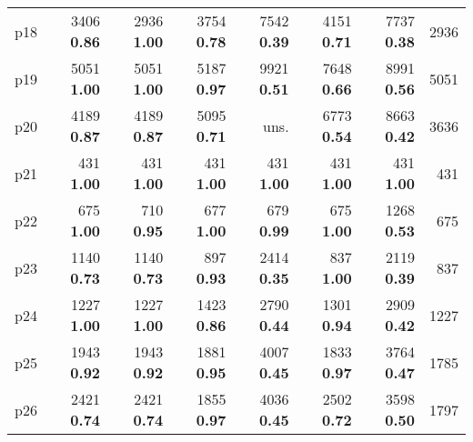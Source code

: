 \begin{tabular}{lrrrrrrr}
\multicolumn{1}{l|}{p18} & {\footnotesize 3406} \textbf{0.86} & {\footnotesize 2936} \textbf{1.00} & {\footnotesize 3754} \textbf{0.78} & {\footnotesize 7542} \textbf{0.39} & {\footnotesize 4151} \textbf{0.71} & {\footnotesize 7737} \textbf{0.38} & \multicolumn{1}{|r}{2936}\\
\multicolumn{1}{l|}{p19} & {\footnotesize 5051} \textbf{1.00} & {\footnotesize 5051} \textbf{1.00} & {\footnotesize 5187} \textbf{0.97} & {\footnotesize 9921} \textbf{0.51} & {\footnotesize 7648} \textbf{0.66} & {\footnotesize 8991} \textbf{0.56} & \multicolumn{1}{|r}{5051}\\
\multicolumn{1}{l|}{p20} & {\footnotesize 4189} \textbf{0.87} & {\footnotesize 4189} \textbf{0.87} & {\footnotesize 5095} \textbf{0.71} & uns. & {\footnotesize 6773} \textbf{0.54} & {\footnotesize 8663} \textbf{0.42} & \multicolumn{1}{|r}{3636}\\
\multicolumn{1}{l|}{p21} & {\footnotesize 431} \textbf{1.00} & {\footnotesize 431} \textbf{1.00} & {\footnotesize 431} \textbf{1.00} & {\footnotesize 431} \textbf{1.00} & {\footnotesize 431} \textbf{1.00} & {\footnotesize 431} \textbf{1.00} & \multicolumn{1}{|r}{431}\\
\multicolumn{1}{l|}{p22} & {\footnotesize 675} \textbf{1.00} & {\footnotesize 710} \textbf{0.95} & {\footnotesize 677} \textbf{1.00} & {\footnotesize 679} \textbf{0.99} & {\footnotesize 675} \textbf{1.00} & {\footnotesize 1268} \textbf{0.53} & \multicolumn{1}{|r}{675}\\
\multicolumn{1}{l|}{p23} & {\footnotesize 1140} \textbf{0.73} & {\footnotesize 1140} \textbf{0.73} & {\footnotesize 897} \textbf{0.93} & {\footnotesize 2414} \textbf{0.35} & {\footnotesize 837} \textbf{1.00} & {\footnotesize 2119} \textbf{0.39} & \multicolumn{1}{|r}{837}\\
\multicolumn{1}{l|}{p24} & {\footnotesize 1227} \textbf{1.00} & {\footnotesize 1227} \textbf{1.00} & {\footnotesize 1423} \textbf{0.86} & {\footnotesize 2790} \textbf{0.44} & {\footnotesize 1301} \textbf{0.94} & {\footnotesize 2909} \textbf{0.42} & \multicolumn{1}{|r}{1227}\\
\multicolumn{1}{l|}{p25} & {\footnotesize 1943} \textbf{0.92} & {\footnotesize 1943} \textbf{0.92} & {\footnotesize 1881} \textbf{0.95} & {\footnotesize 4007} \textbf{0.45} & {\footnotesize 1833} \textbf{0.97} & {\footnotesize 3764} \textbf{0.47} & \multicolumn{1}{|r}{1785}\\
\multicolumn{1}{l|}{p26} & {\footnotesize 2421} \textbf{0.74} & {\footnotesize 2421} \textbf{0.74} & {\footnotesize 1855} \textbf{0.97} & {\footnotesize 4036} \textbf{0.45} & {\footnotesize 2502} \textbf{0.72} & {\footnotesize 3598} \textbf{0.50} & \multicolumn{1}{|r}{1797}\\

\end{tabular}
